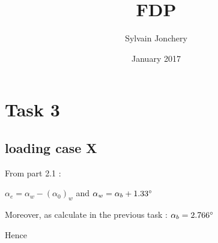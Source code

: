 \documentclass{article}
\title{FDP}
\author{Sylvain Jonchery }
\date{January 2017}
\begin{document}
\maketitle

\section{Task 3}

\subsection{loading case X}

From \cite{dataPack} part 2.1 : 

$\alpha_e=\alpha_w -(\alpha_0)_w$ and $\alpha_w=\alpha_b+1.33\degree$

Moreover, as calculate in the previous task : $\alpha_b=2.  766\degree$

Hence 


{}

\end{document}

